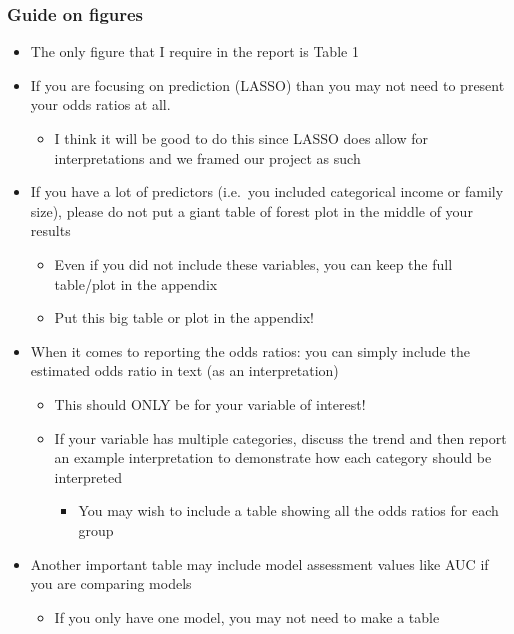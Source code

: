 \documentclass[
  letterpaper,
  DIV=11,
  numbers=noendperiod]{scrartcl}
\providecommand{\tightlist}{%
  \setlength{\itemsep}{0pt}\setlength{\parskip}{0pt}}\usepackage{longtable,booktabs,array}
\begin{document}
\subsubsection{Guide on figures}\label{guide-on-figures}

\begin{itemize}
\tightlist
\item
  The only figure that I require in the report is Table 1
\item
  If you are focusing on prediction (LASSO) than you may not need to
  present your odds ratios at all.

  \begin{itemize}
  \tightlist
  \item
    I think it will be good to do this since LASSO does allow for
    interpretations and we framed our project as such
  \end{itemize}
\item
  If you have a lot of predictors (i.e.~you included categorical income
  or family size), please do not put a giant table of forest plot in the
  middle of your results

  \begin{itemize}
  \tightlist
  \item
    Even if you did not include these variables, you can keep the full
    table/plot in the appendix
  \item
    Put this big table or plot in the appendix!
  \end{itemize}
\item
  When it comes to reporting the odds ratios: you can simply include the
  estimated odds ratio in text (as an interpretation)

  \begin{itemize}
  \tightlist
  \item
    This should ONLY be for your variable of interest!
  \item
    If your variable has multiple categories, discuss the trend and then
    report an example interpretation to demonstrate how each category
    should be interpreted

    \begin{itemize}
    \tightlist
    \item
      You may wish to include a table showing all the odds ratios for
      each group
    \end{itemize}
  \end{itemize}
\item
  Another important table may include model assessment values like AUC
  if you are comparing models

  \begin{itemize}
  \tightlist
  \item
    If you only have one model, you may not need to make a table
  \end{itemize}
\end{itemize}
\end{document}
